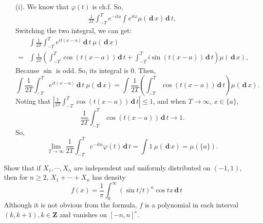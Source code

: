 \documentclass[en, normal, 12pt, black]{elegantnote}
\newenvironment{exercise}[1]{\begin{tcolorbox}[colback=black!15, colframe=black!80, breakable, title=#1]}{\end{tcolorbox}}
\newenvironment{solution}{\begin{tcolorbox}[colback=white, colframe=black!50, breakable, title=Solution. ]\setlength{\parskip}{0.8em}}{\end{tcolorbox}}
\newcommand{\der}{\,\mathbf{d}\,}
\begin{document}
    \begin{solution}
        \begin{itemize}
            \item[(i).] We know that $\varphi(t)$ is ch.f. So, 
            \[
                \begin{aligned}
                    \frac{1}{2T} \int_{-T}^{T} e^{-i t a} \int e^{i t x} \mu(\der x) \der t, 
                \end{aligned}
            \]
            Switching the two integral, we can get: 
            \[
                \begin{aligned}
                    & \int \frac{1}{2 T} \int_{-T}^{T} e^{i t(x-a)} \der t\ \mu(\der x)\\ = & \int \frac{1}{2 T} \left(\int_{-T}^{T} \cos (t(x-a)) \der t+\int_{-T}^{T} i \sin (t(x-a)) \der t\right)\mu(\der x), 
                \end{aligned}
            \]
            Because $\sin$ is odd. So, its integral is $0$. Then, 
            \[
                \int \frac{1}{2 T} \int_{-T}^{T} e^{i t(x-a)} \der t\ \mu(\der x)=\int \frac{1}{2 T} \left(\int_{-T}^{T} \cos (t(x-a)) \der t\right)\mu(\der x). 
            \]
            Noting that $\left|\frac{1}{2 T} \int_{-T}^{T} \cos (t(x-a)) \der t\right| \leqslant 1$, and when $T \rightarrow \infty$, $x\in\{a\}$, 
            \[
                \frac{1}{2 T} \int_{-T}^{T} \cos (t(x-a)) \der t \rightarrow 1. 
            \]
            So, 
            \[
                \lim _{T \rightarrow \infty} \frac{1}{2 T} \int_{-T}^{T} e^{-i t a} \varphi(t) \der t=\int 1\ \mu(\der x)=\mu(\{a\}). 
            \]
        \end{itemize}
    \end{solution}

\begin{exercise}{3.3.5}
    Show that if $X_{1}, \cdots, X_{n}$ are independent and uniformly distributed on $(-1,1)$, then for $n \geqslant 2$, $X_{1}+\cdots+X_{n}$ has density
    \[
        f(x)=\frac{1}{\pi} \int_{0}^{\infty}(\sin t / t)^{n} \cos t x \der t
    \]
    Although it is not obvious from the formula, $f$ is a polynomial in each interval $(k, k+1), k \in \mathbf{Z}$ and vanishes on $[-n, n]^{c}$.         
\end{exercise}
\end{document}
